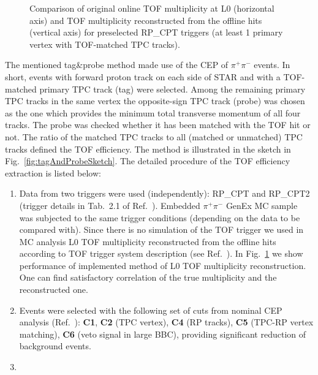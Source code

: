 \begin{figure}[b!]
\begin{minipage}{.4725\textwidth}
  \caption[Comparison of original and reconstructed TOF multiplicity at the trigger level.]
   {Comparison of original online TOF multiplicity at L0 (horizontal axis) and TOF multiplicity reconstructed from the offline hits (vertical axis) for preselected RP\_CPT triggers (at least 1 primary vertex with TOF-matched TPC tracks).}
   \label{fig:tofOnlineMultRecoVsL0}%
\end{minipage}%
\end{figure}%

The mentioned tag\&probe method made use of the CEP of $\pi^{+}\pi^{-}$ events. In short, events with forward proton track on each side of STAR and with a TOF-matched primary TPC track (tag) were selected. Among the remaining primary TPC tracks in the same vertex the opposite-sign TPC track (probe) was chosen as the one which provides the minimum total transverse momentum of all four tracks. The probe was checked whether it has been matched with the TOF hit or not. The ratio of the matched TPC tracks to all (matched or unmatched) TPC tracks defined the TOF efficiency. The method is illustrated in the sketch in Fig.~\ref{fig:tagAndProbeSketch}. The detailed procedure of the TOF efficiency extraction is listed below:

\begin{enumerate}
 \item Data from two triggers were used (independently): RP\_CPT and RP\_CPT2 (trigger details in Tab.~2.1 of Ref.~\cite{AnalysisNoteRafal}). Embedded $\pi^{+}\pi^{-}$ GenEx MC sample was subjected to the same trigger conditions (depending on the data to be compared with). Since there is no simulation of the TOF trigger we used in MC analysis L0 TOF multiplicity reconstructed from the offline hits according to TOF trigger system description (see Ref.~\cite{tofL0MultExplanation}). In Fig.~\ref{fig:tofOnlineMultRecoVsL0} we show performance of implemented method of L0 TOF multiplicity reconstruction. One can find satisfactory correlation of the true multiplicity and the reconstructed one.
 \item Events were selected with the following set of cuts from nominal CEP analysis (Ref.~\cite{AnalysisNoteRafal}): \textbf{C1}, \textbf{C2} (TPC vertex), \textbf{C4} (RP tracks), \textbf{C5} (TPC-RP vertex matching), \textbf{C6} (veto signal in large BBC), providing significant reduction of background events.
 \item 
\end{enumerate}

